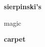 \documentclass[varwidth,border=0.01in]{standalone}
\begin{document}
\begin{center}
\textbf{sierpinski's}

\textcolor{snow_cherry}{magic}

\textbf{carpet}
\end{center}
\end{document}
